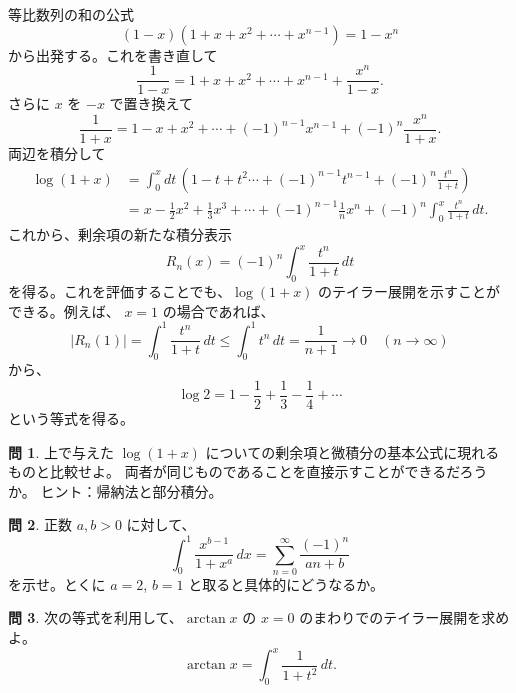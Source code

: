 \documentclass[a4paper]{jsarticle}
\theoremstyle{definition}
\newtheorem{Exercise}{問}%
\theoremstyle{remark}
\begin{document}
等比数列の和の公式
\[
(1-x)(1+x+x^2+\cdots +x^{n-1}) = 1 - x^n
\]
から出発する。これを書き直して
\[
\frac{1}{1-x} = 1 + x + x^2 + \cdots + x^{n-1} + \frac{x^n}{1-x}.
\]
さらに $x$ を $-x$ で置き換えて
\[
\frac{1}{1+x} = 1 - x + x^2 +\cdots + (-1)^{n-1}x^{n-1} +
(-1)^n \frac{x^n}{1+x}.
\]
両辺を積分して
\begin{align*}
\log(1+x) &= \int_0^xdt\,(1-t+t^2\cdots + (-1)^{n-1}t^{n-1} +
(-1)^n \frac{t^n}{1+t})\\
&= x - \frac{1}{2}x^2 + \frac{1}{3}x^3 + \cdots +
(-1)^{n-1} \frac{1}{n}x^n +
(-1)^n \int_0^x\frac{t^n}{1+t}\,dt.
\end{align*}
これから、剰余項の新たな積分表示
\[
R_n(x) = (-1)^n \int_0^x\frac{t^n}{1+t}\,dt 
\]
を得る。これを評価することでも、$\log(1+x)$ のテイラー展開を示すことができる。例えば、
$x=1$ の場合であれば、
\[
|R_n(1)| = \int_0^1\frac{t^n}{1+t}\,dt 
\leq \int_0^1 t^n\, dt = \frac{1}{n+1} \to 0 
\quad 
(n \to \infty)
\]
から、
\[
\log 2 = 1 - \frac{1}{2} + \frac{1}{3} - \frac{1}{4} + \cdots 
\]
という等式を得る。

\begin{Exercise}
上で与えた $\log(1+x)$ についての剰余項と微積分の基本公式に現れるものと比較せよ。
両者が同じものであることを直接示すことができるだろうか。
ヒント：帰納法と部分積分。
\end{Exercise}

\begin{Exercise}
正数 $a,b>0$ に対して、
\[
\int_0^1 \frac{x^{b-1}}{1 + x^a}\,dx 
= \sum_{n=0}^\infty \frac{(-1)^n}{an + b}
\]
を示せ。とくに $a=2$, $b=1$ と取ると具体的にどうなるか。
\end{Exercise}

\begin{Exercise}
次の等式を利用して、$\arctan x$ の $x=0$ のまわりでのテイラー展開を求めよ。
\[
\arctan x = \int_0^x \frac{1}{1+t^2}\, dt. 
\]
\end{Exercise}
\end{document}
